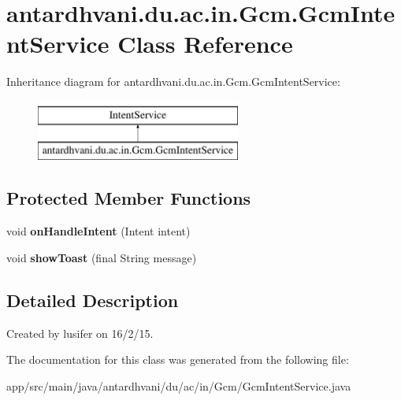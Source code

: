 \hypertarget{classantardhvani_1_1du_1_1ac_1_1in_1_1_gcm_1_1_gcm_intent_service}{}\section{antardhvani.\+du.\+ac.\+in.\+Gcm.\+Gcm\+Intent\+Service Class Reference}
\label{classantardhvani_1_1du_1_1ac_1_1in_1_1_gcm_1_1_gcm_intent_service}
Inheritance diagram for antardhvani.\+du.\+ac.\+in.\+Gcm.\+Gcm\+Intent\+Service\+:\begin{figure}[H]
\begin{center}
\leavevmode
\includegraphics[height=2.000000cm]{classantardhvani_1_1du_1_1ac_1_1in_1_1_gcm_1_1_gcm_intent_service}
\end{center}
\end{figure}
\subsection*{Protected Member Functions}
\begin{DoxyCompactItemize}
\item 
\hypertarget{classantardhvani_1_1du_1_1ac_1_1in_1_1_gcm_1_1_gcm_intent_service_aa69af210a49f9502a2601410dd61d79f}{}void {\bfseries on\+Handle\+Intent} (Intent intent)\label{classantardhvani_1_1du_1_1ac_1_1in_1_1_gcm_1_1_gcm_intent_service_aa69af210a49f9502a2601410dd61d79f}

\item 
\hypertarget{classantardhvani_1_1du_1_1ac_1_1in_1_1_gcm_1_1_gcm_intent_service_a0838ea1c29038b5e73c1591851b43766}{}void {\bfseries show\+Toast} (final String message)\label{classantardhvani_1_1du_1_1ac_1_1in_1_1_gcm_1_1_gcm_intent_service_a0838ea1c29038b5e73c1591851b43766}

\end{DoxyCompactItemize}


\subsection{Detailed Description}
Created by lusifer on 16/2/15. 

The documentation for this class was generated from the following file\+:\begin{DoxyCompactItemize}
\item 
app/src/main/java/antardhvani/du/ac/in/\+Gcm/Gcm\+Intent\+Service.\+java\end{DoxyCompactItemize}
